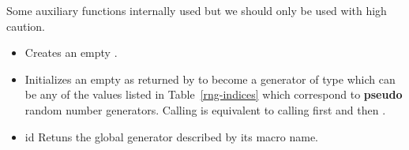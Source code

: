 Some auxiliary functions internally used but we should only be used with high
caution.
\begin{itemize}
\item {}
  \sshortdescribe Creates an empty .
\item {}
  \sshortdescribe Initializes an empty  as returned by
   to become a generator of type  which can be
  any of the values  listed in Table~\ref{rng-indices} which
  correspond to {\bf pseudo} random number generators.
  Calling  is equivalent to calling first
   and then . 
\item {}
  { id}
  \sshortdescribe Retuns the global generator described by its macro name.
\end{itemize}


